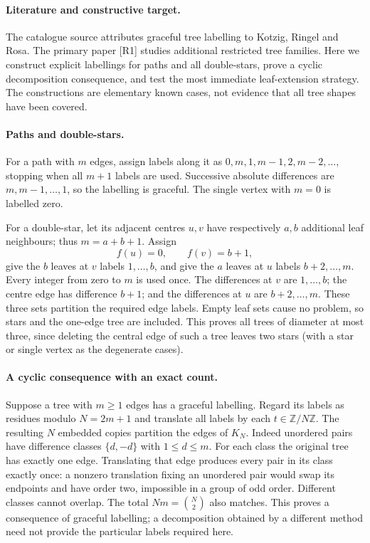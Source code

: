 \documentclass[11pt,a4paper]{article}
\begin{document}
\paragraph{Literature and constructive target.}
The catalogue source attributes graceful tree labelling to Kotzig, Ringel
and Rosa. The primary paper [R1] studies additional restricted tree
families. Here we construct explicit labellings for paths and all
double-stars, prove a cyclic decomposition consequence, and test the
most immediate leaf-extension strategy. The constructions are elementary
known cases, not evidence that all tree shapes have been covered.

\paragraph{Paths and double-stars.}
For a path with $m$ edges, assign labels along it as
$0,m,1,m-1,2,m-2,\ldots$, stopping when all $m+1$ labels are used.
Successive absolute differences are $m,m-1,\ldots,1$, so the labelling
is graceful. The single vertex with $m=0$ is labelled zero.

For a double-star, let its adjacent centres $u,v$ have respectively
$a,b$ additional leaf neighbours; thus $m=a+b+1$. Assign
\[
 f(u)=0,\qquad f(v)=b+1,
\]
give the $b$ leaves at $v$ labels $1,\ldots,b$, and give the $a$ leaves
at $u$ labels $b+2,\ldots,m$. Every integer from zero to $m$ is used once.
The differences at $v$ are $1,\ldots,b$; the centre edge has difference
$b+1$; and the differences at $u$ are $b+2,\ldots,m$. These three sets
partition the required edge labels. Empty leaf sets cause no problem,
so stars and the one-edge tree are included. This proves all trees of
diameter at most three, since deleting the central edge of such a tree
leaves two stars (with a star or single vertex as the degenerate cases).

\paragraph{A cyclic consequence with an exact count.}
Suppose a tree with $m\ge1$ edges has a graceful labelling. Regard its
labels as residues modulo $N=2m+1$ and translate all labels by each
$t\in\mathbb Z/N\mathbb Z$. The resulting $N$ embedded copies partition
the edges of $K_N$. Indeed unordered pairs have difference classes
$\{d,-d\}$ with $1\le d\le m$. For each class the original tree has
exactly one edge. Translating that edge produces every pair in its class
exactly once: a nonzero translation fixing an unordered pair would swap
its endpoints and have order two, impossible in a group of odd order.
Different classes cannot overlap. The total $Nm=\binom N2$ also matches.
This proves a consequence of graceful labelling; a decomposition obtained
by a different method need not provide the particular labels required here.
\end{document}
